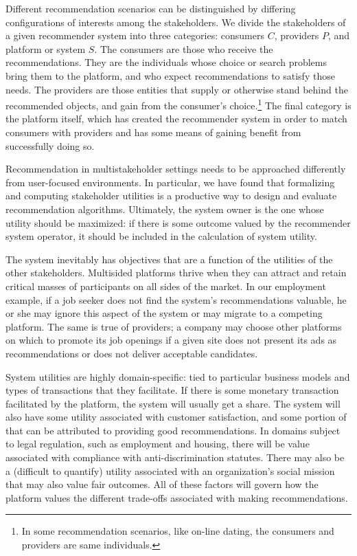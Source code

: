 Different recommendation scenarios can be distinguished by differing configurations of interests among the stakeholders. We divide the stakeholders of a given recommender system into three categories: consumers $C$, providers $P$, and platform or system $S$. The consumers are those who receive the recommendations. They are the individuals whose choice or search problems bring them to the platform, and who expect recommendations to satisfy those needs. The providers are those entities that supply or otherwise stand behind the recommended objects, and gain from the consumer's choice.\footnote{In some recommendation scenarios, like on-line dating, the consumers and providers are same individuals.} The final category is the platform itself, which has created the recommender system in order to match consumers with providers and has some means of gaining benefit from successfully doing so. 

Recommendation in multistakeholder settings needs to be approached differently from user-focused environments. In particular, we have found that formalizing and computing stakeholder utilities is a productive way to design and evaluate recommendation algorithms. Ultimately, the system owner is the one whose utility should be maximized: if there is some outcome valued by the recommender system operator, it should be included in the calculation of system utility. 

The system inevitably has objectives that are a function of the utilities of the other stakeholders. Multisided platforms thrive when they can attract and retain critical masses of participants on all sides of the market. In our employment example, if a job seeker does not find the system's recommendations valuable, he or she may ignore this aspect of the system or may migrate to a competing platform. The same is true of providers; a company may choose other platforms on which to promote its job openings if a given site does not present its ads as recommendations or does not deliver acceptable candidates.

System utilities are highly domain-specific: tied to particular business models and types of transactions that they facilitate. If there is some monetary transaction facilitated by the platform, the system will usually get a share. The system will also have some utility associated with customer satisfaction, and some portion of that can be attributed to providing good recommendations. In domains subject to legal regulation, such as employment and housing, there will be value associated with compliance with anti-discrimination statutes. There may also be a (difficult to quantify) utility associated with an organization's social mission that may also value fair outcomes. All of these factors will govern how the platform values the different trade-offs associated with making recommendations.




